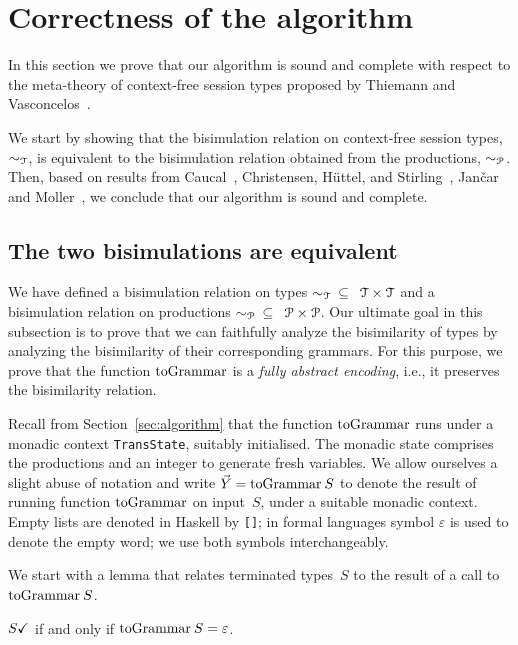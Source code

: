 \section{Correctness of the algorithm}
\label{sec:soundness}

In this section we prove that our algorithm is sound and complete
with respect to the meta-theory of context-free session types proposed
by Thiemann and Vasconcelos~\cite{thiemann2016context}.

We start by showing that the bisimulation relation on context-free
session types, $\sim_\mathcal T$, is equivalent to the bisimulation
relation obtained from the productions, $\sim_\mathcal P$.  Then, based on
results from Caucal~\cite{caucal1986decidabilite}, Christensen,
H{\"{u}}ttel, and Stirling~\cite{DBLP:journals/iandc/ChristensenHS95},
Jan{\v{c}}ar and Moller~\cite{janvcar1999techniques}, we conclude that
our algorithm is sound and complete.

\subsection{The two bisimulations are equivalent}

We have defined a bisimulation relation on types 
$\sim_\mathcal T \enspace\subseteq \enspace\mathcal{T} \times \mathcal{T}$
and a bisimulation relation on productions 
$\sim_\mathcal P \enspace\subseteq \enspace\mathcal{P} \times \mathcal{P}$.
Our ultimate goal in this subsection is to prove that we can 
faithfully analyze the bisimilarity of types 
by analyzing the bisimilarity of their corresponding
grammars. For this purpose, we prove that the function $\toGrammark$ 
is a {\it fully abstract encoding}, i.e., it preserves the 
bisimilarity relation.

Recall from Section~\ref{sec:algorithm} that the function $\toGrammark$ 
runs under a monadic context
\lstinline|TransState|, suitably initialised.
%
The monadic state comprises the productions and an integer to generate
fresh variables.
%
We allow ourselves a slight abuse of notation and write
$\vec Y = \toGrammarf S$ to denote the result of running function
$\toGrammark$ on input~$S$, under a suitable monadic context.
%
Empty lists are denoted in Haskell by \lstinline|[]|;
in formal languages symbol $\varepsilon$ is used to denote the empty
word; we use both symbols interchangeably.

We start with a lemma that relates terminated types~$S$ to the result 
of a call to $\toGrammarf S$.

\begin{lemma}
	\label{lemma:terminated-togrammar}
	 $S\checkmark$ if and only if $\toGrammarf S = \varepsilon$.
\end{lemma}

